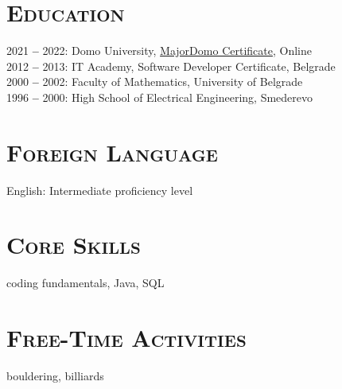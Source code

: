 \documentclass[12pt]{article}
\begin{document}
\section{\textsc{Education}}

    2021 \textbf{--} 2022: Domo University, \href{https://drive.google.com/file/d/1i-GzyE43WospitxXdFWp2bRYe6wqZG48/view?usp=sharing}{MajorDomo Certificate}, Online \\
    2012 \textbf{--} 2013: IT Academy, Software Developer Certificate, Belgrade \\
    2000 \textbf{--} 2002: Faculty of Mathematics, University of Belgrade \\
    1996 \textbf{--} 2000: High School of Electrical Engineering, Smederevo

\section{\textsc{Foreign Language}} 

    English: Intermediate proficiency level

\section{\textsc{Core Skills}}
 
    coding fundamentals, Java, SQL

\section{\textsc{Free-Time Activities}}

    bouldering, billiards
\end{document}
